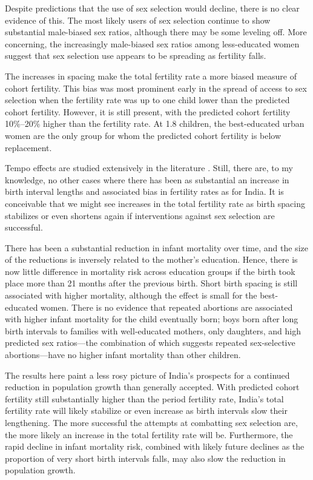 \documentclass[12pt,letterpaper]{article}
\begin{document}
Despite predictions that the use of sex selection would decline, there is no clear 
evidence of this. 
The most likely users of sex selection continue to show substantial male-biased sex ratios, 
although there may be some leveling off.
More concerning, the increasingly male-biased sex ratios among less-educated women suggest
that sex selection use appears to be spreading as fertility falls.



The increases in spacing make the total fertility rate a more biased measure of cohort 
fertility. 
This bias was most prominent early in the spread of access to sex selection when the 
fertility rate was up to one child lower than the predicted cohort fertility. 
However, it is still present, with the predicted cohort fertility 10\%--20\% 
higher than the fertility rate. 
At 1.8 children, the best-educated urban women are the only group for whom the predicted 
cohort fertility is below replacement.

Tempo effects are studied extensively in the literature \citep[see, for example, ][]{Bongaarts1999}.
Still, there are, to my knowledge, no other cases where there has been as 
substantial an increase in birth interval lengths and associated bias in fertility rates 
as for India.
It is conceivable that we might see increases in the total fertility rate as birth spacing 
stabilizes or even shortens again if interventions against sex selection are successful.


There has been a substantial reduction in infant mortality over time, and the size of the 
reductions is inversely related to the mother's education.
Hence, there is now little difference in mortality risk across education groups if the 
birth took place more than 21 months after the previous birth.
Short birth spacing is still associated with higher mortality, although the effect is 
small for the best-educated women.
There is no evidence that repeated abortions are associated with higher infant mortality
for the child eventually born; boys born after long birth intervals to families with
well-educated mothers, only daughters, and high predicted sex ratios---the combination of
which suggests repeated sex-selective abortions---have no higher infant mortality than other
children.  


The results here paint a less rosy picture of India's prospects for a continued reduction 
in population growth than generally accepted. 
With predicted cohort fertility still substantially higher than the period fertility rate, 
India's total fertility rate will likely stabilize or even increase as birth intervals slow 
their lengthening. 
The more successful the attempts at combatting sex selection are, the more likely an 
increase in the total fertility rate will be. 
Furthermore, the rapid decline in infant mortality risk, combined with likely future 
declines as the proportion of very short birth intervals falls, may also slow the 
reduction in population growth. 
\end{document}
